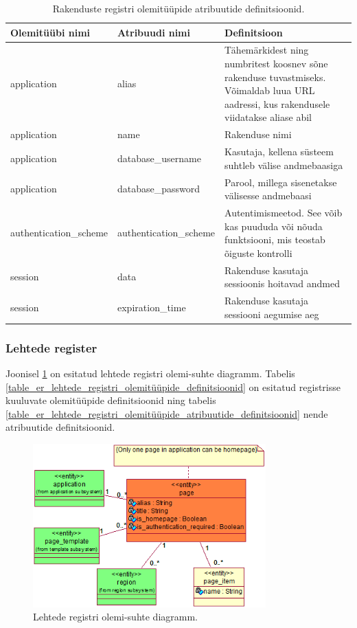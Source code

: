 \documentclass[a4paper,12pt]{article} %
\begin{document}
\begin{table}[H]
\centering
\caption{Rakenduste registri olemitüüpide atribuutide definitsioonid.}
\label{table_er_rakenduste_registri_olemitüüpide_atribuutide_definitsioonid}
\begin{tabular}{|p{4cm}|p{4cm}|p{7cm}|}
\hline
\rowcolor{rowgray}
Olemitüübi nimi & Atribuudi nimi & Definitsioon \\ \hline
application & alias & Tähemärkidest ning numbritest koosnev sõne rakenduse tuvastmiseks. Võimaldab luua URL aadressi, kus rakendusele viidatakse aliase abil \\ \hline
application  & name & Rakenduse nimi \\ \hline
application  & database\_username & Kasutaja, kellena süsteem suhtleb välise andmebaasiga \\ \hline
application  & database\_password & Parool, millega sisenetakse välisesse andmebaasi \\ \hline
authentication\_scheme & authentication\_scheme & Autentimismeetod. See võib kas puududa või nõuda funktsiooni, mis teostab õiguste kontrolli \\ \hline
session & data & Rakenduse kasutaja sessioonis hoitavad andmed \\ \hline
session & expiration\_time & Rakenduse kasutaja sessiooni aegumise aeg \\ \hline
\end{tabular}
\end{table}

\subsubsection{Lehtede register}
Joonisel \ref{fig_lehtede_registri_olemi_suhte_diagramm} on esitatud lehtede registri olemi-suhte diagramm. Tabelis \ref{table_er_lehtede_registri_olemitüüpide_definitsioonid} on esitatud registrisse kuuluvate olemitüüpide definitsioonid ning tabelis \ref{table_er_lehtede_registri_olemitüüpide_atribuutide_definitsioonid} nende atribuutide definitsioonid.

\begin{figure}[H]
\centering
\includegraphics[width=0.8\textwidth]{./diagrams/page-er-diagram.png}
\caption{Lehtede registri olemi-suhte diagramm.}
\label{fig_lehtede_registri_olemi_suhte_diagramm}
\end{figure}
\end{document}
